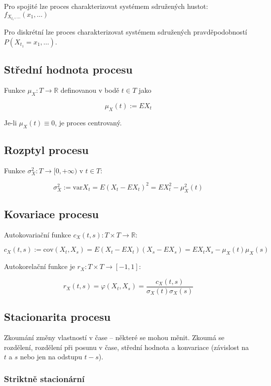 Pro spojité lze proces charakterizovat systémem sdružených hustot: $f_{X_{t_1}, \dots}(x_1, \dots)$

Pro diskrétní lze proces charakterizovat systémem sdružených pravděpodobností $P(X_{t_1} = x_1, \dots)$.

\subsection{Střední hodnota procesu}

Funkce $\mu_X: T \rightarrow \mathbb{R}$ definovanou v bodě $t \in T$ jako

$$
    \mu_X(t):= EX_t
$$

Je-li $\mu_X(t) \equiv 0$, je proces centrovaný.

\subsection{Rozptyl procesu}

Funkce $\sigma_{X}^2: T \rightarrow [0, + \infty)$ v $t \in T$:

$$
    \sigma_{X}^2 := \textrm{var} X_t = E(X_t - EX_t)^2 = EX_{t}^2 - \mu_{X}^{2}(t)
$$

\subsection{Kovariace procesu}

Autokovariační funkce $c_X(t,s): T \times T \rightarrow \mathbb{R}$:

$$
    c_X(t, s) := \textrm{cov}(X_t, X_s) = E(X_t - EX_t)(X_s-EX_s) = EX_tX_s - \mu_X(t)\mu_X(s)
$$

Autokorelační funkce je $r_X: T \times T \rightarrow [-1, 1]$:

$$
    r_X(t,s) = \varphi(X_t, X_s) = \frac{c_X(t,s)}{\sigma_X(t)\sigma_X(s)}
$$

\subsection{Stacionarita procesu}

Zkoumání změny vlastností v čase -- některé se mohou měnit.
Zkoumá se rozdělení, rozdělení při posunu v čase, střední hodnota a konvariace (závislost na $t$ a $s$ nebo jen na odstupu $t-s$).

\subsubsection*{Striktně stacionární}


